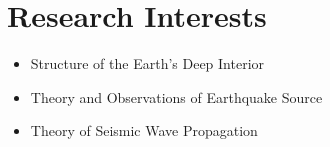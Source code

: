 \section{Research Interests}

\begin{itemize}
\item Structure of the Earth's Deep Interior
\item Theory and Observations of Earthquake Source
\item Theory of Seismic Wave Propagation
\end{itemize}
